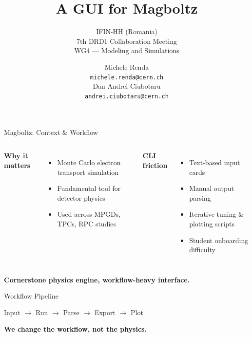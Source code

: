 \documentclass[aspectratio=169]{beamer}
\title{A GUI for Magboltz}
\subtitle{IFIN-HH (Romania)\\7th DRD1 Collaboration Meeting\\WG4 --- Modeling and Simulations}
\author{Michele Renda\\\texttt{michele.renda@cern.ch}\\Dan Andrei Ciubotaru\\\texttt{andrei.ciubotaru@cern.ch}}
\begin{document}
\begin{frame}
  \titlepage
\end{frame}

\begin{frame}{Magboltz: Context \& Workflow}
\begin{columns}[T]
    \textbf{Why it matters}
    \begin{itemize}
      \item Monte Carlo electron transport simulation
      \item Fundamental tool for detector physics
      \item Used across MPGDs, TPCs, RPC studies
    \end{itemize}
    \textbf{CLI friction}
    \begin{itemize}
      \item Text-based input cards
      \item Manual output parsing
      \item Iterative tuning \& plotting scripts
      \item Student onboarding difficulty
    \end{itemize}
\end{columns}
\vspace{0.2cm}
\textbf{Cornerstone physics engine, workflow-heavy interface.}
\end{frame}

\begin{frame}{Workflow Pipeline}
\vspace{0.2cm}
\begin{center}
\Large
Input \(\rightarrow\) Run \(\rightarrow\) Parse \(\rightarrow\) Export \(\rightarrow\) Plot
\end{center}
\vspace{0.4cm}
\begin{center}
\textbf{We change the workflow, not the physics.}
\end{center}
\end{frame}
\end{document}
